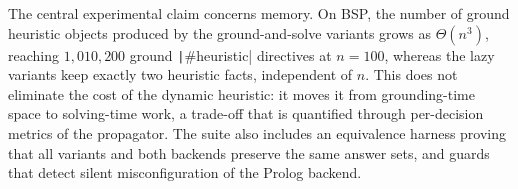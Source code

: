 The central experimental claim concerns memory. On BSP, the number of ground heuristic objects produced by the ground-and-solve variants grows as $\Theta(n^3)$, reaching $1{,}010{,}200$ ground \texttt|#heuristic| directives at $n=100$, whereas the lazy variants keep exactly two heuristic facts, independent of $n$. This does not eliminate the cost of the dynamic heuristic: it moves it from grounding-time space to solving-time work, a trade-off that is quantified through per-decision metrics of the propagator. The suite also includes an equivalence harness proving that all variants and both backends preserve the same answer sets, and guards that detect silent misconfiguration of the Prolog backend.
